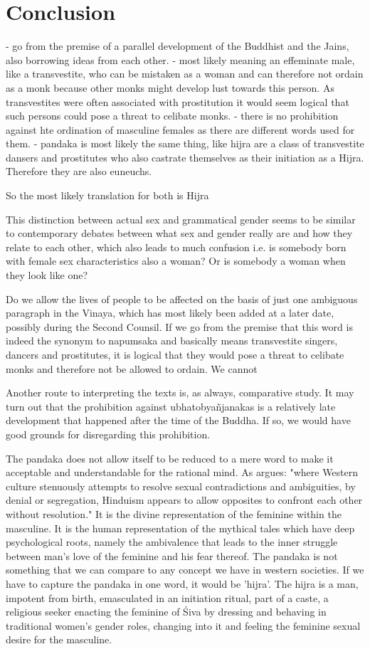 \section{Conclusion}
- go from the premise of a parallel development of the Buddhist and the Jains, also borrowing ideas from each other.
- most likely meaning an effeminate male, like a transvestite, who can be mistaken as a woman and can therefore not ordain as a monk because other monks might develop lust towards this person. As transvestites were often associated with prostitution it would seem logical that such persons could pose a threat to celibate monks. 
- there is no prohibition against hte ordination of masculine females as there are different words used for them.
- pandaka is most likely the same thing, like hijra are a class of transvestite dansers and prostitutes who also castrate themselves as their initiation as a Hijra. Therefore they are also euneuchs.

So the most likely translation for both is Hijra


This distinction between actual sex and grammatical gender seems to be similar to contemporary debates between what sex and gender really are and how they relate to each other, which also leads to much confusion i.e. is somebody born with female sex characteristics also a woman? Or is somebody a woman when they look like one?


Do we allow the lives of people to be affected on the basis of just one ambiguous paragraph in the Vinaya, which has most likely been added at a later date, possibly during the Second Counsil. If we go from the premise that this word is indeed the synonym to napumsaka and basically means transvestite singers, dancers and prostitutes, it is logical that they would pose a threat to celibate monks and therefore not be allowed to ordain. We cannot 


Another route to interpreting the texts is, as always, comparative study. It may turn out that the prohibition against ubhatobyañjanakas is a relatively late development that happened after the time of the Buddha. If so, we would have good grounds for disregarding this prohibition.


The pandaka does not allow itself to be reduced to a mere word to make it acceptable and understandable for the rational mind. As \cite{nanda} argues: "where Western culture stenuously attempts to resolve sexual contradictions and ambiguities, by denial or segregation, Hinduism appears to allow opposites to confront each other without resolution." It is the divine representation of the feminine within the masculine. It is the human representation of the mythical tales which have deep psychological roots, namely the ambivalence that leads to the inner struggle between man's love of the feminine and his fear thereof. The pandaka is not something that we can compare to any concept we have in western societies. If we have to capture the pandaka in one word, it would be 'hijra'. The hijra is a man, impotent from birth, emasculated in an initiation ritual, part of a caste, a religious seeker enacting the feminine of Śiva by dressing and behaving in traditional women's gender roles, changing into it and feeling the feminine sexual desire for the masculine.

